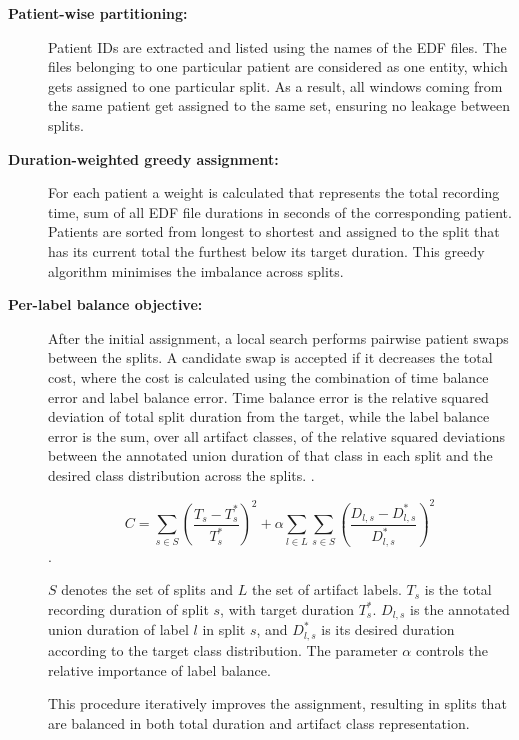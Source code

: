 \begin{description}

\item[\textbf{Patient-wise partitioning:}] Patient IDs are extracted and listed using the names of the EDF files. The files belonging to one particular patient are considered as one entity, which gets assigned to one particular split. As a result, all windows coming from the same patient get assigned to the same set, ensuring no leakage between splits.

\item[\textbf{Duration-weighted greedy assignment:}] For each patient a weight is calculated that represents the total recording time, sum of all EDF file durations in seconds of the corresponding patient. Patients are sorted from longest to shortest and assigned to the split that has its current total the furthest below its target duration. This greedy algorithm minimises the imbalance across splits.

\item[\textbf{Per-label balance objective:}] After the initial assignment, a local search performs pairwise patient swaps between the splits. A candidate swap is accepted if it decreases the total cost, where the cost is calculated using the combination of time balance error and label balance error. Time balance error is the relative squared deviation of total split duration from the target, while the label balance error is the sum, over all artifact classes, of the relative squared deviations between the annotated union duration of that class in each split and the desired class distribution across the splits. 
\newline.

\[
C = \sum_{s \in S} \left(\frac{T_s - T_s^{*}}{T_s^{*}}\right)^2
+ \alpha \sum_{l \in L} \sum_{s \in S} \left(\frac{D_{l,s} - D_{l,s}^{*}}{D_{l,s}^{*}}\right)^2
\]
\newline.

$S$ denotes the set of splits and $L$ the set of artifact labels. $T_s$ is the total recording duration of split $s$, with target duration $T_s^{*}$. $D_{l,s}$ is the annotated union duration of label $l$ in split $s$, and $D_{l,s}^{*}$ is its desired duration according to the target class distribution. The parameter $\alpha$ controls the relative importance of label balance.

This procedure iteratively improves the assignment, resulting in splits that are balanced in both total duration and artifact class representation.

\end{description}

